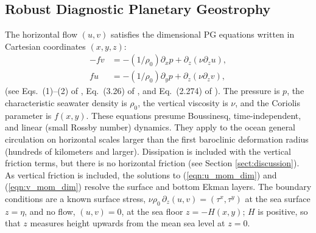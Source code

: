 \documentclass{ametsocV6.2}
\begin{document}
\subsection{Robust Diagnostic Planetary Geostrophy}
\label{sect:dim_eqns}
The horizontal flow $(u,v)$ satisfies the dimensional PG equations written in Cartesian coordinates $(x,y,z)$:
\begin{align}
- f v & = - (1 / \rho_0) \partial_x p +  \partial_z \left( \nu \partial_z u \right), \label{eqn:u_mom_dim} \\
f  u & = - (1 / \rho_0) \partial_y p +  \partial_z \left( \nu \partial_z v \right),  \label{eqn:v_mom_dim}
\end{align}
(see Eqs.~(1)--(2) of \citealt{peterson&callies26}, Eq.~(3.26) of \citealt{klinger&haine19}, and Eq.~(2.274) of \citealt{vallis06}).
The pressure is $p$, the characteristic seawater density is $\rho_0$, the vertical viscosity is $\nu$, and the Coriolis parameter is $f(x,y)$.
These equations presume Boussinesq, time-independent, and linear (small Rossby number) dynamics.
They apply to the ocean general circulation on horizontal scales larger than the first baroclinic deformation radius (hundreds of kilometers and larger).
Dissipation is included with the vertical friction terms, but there is no horizontal friction (see Section \ref{sect:discussion}).
As vertical friction is included, the solutions to (\ref{eqn:u_mom_dim}) and (\ref{eqn:v_mom_dim}) resolve the surface and bottom Ekman layers.
The boundary conditions are a known surface stress, $\nu \rho_0 \, \partial_z (u, v) = (\tau^x, \tau^y)$ at the sea surface $z = \eta$, and no flow, $(u, v) = 0$, at the sea floor $z = -H(x,y)$; $H$ is positive, so that $z$ measures height upwards from the mean sea level at $z = 0$.
\end{document}
